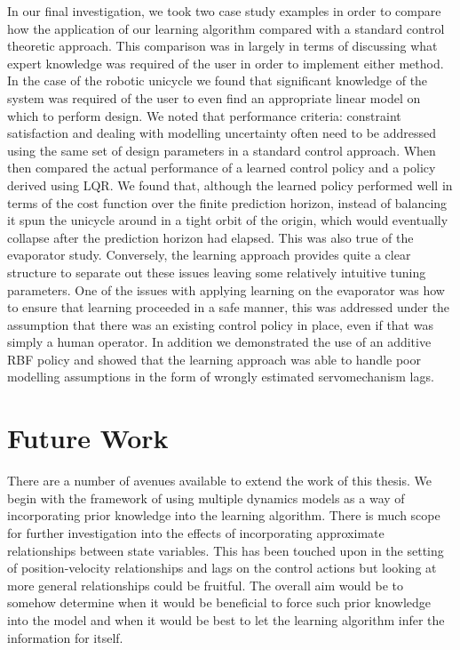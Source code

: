 In our final investigation, we took two case study examples in order to compare how the application of our learning algorithm compared with a standard control theoretic approach. This comparison was in largely in terms of discussing what expert knowledge was required of the user in order to implement either method.  In the case of the robotic unicycle we found that significant knowledge of the system was required of the user to even find an appropriate linear model on which to perform design. We noted that performance criteria: constraint satisfaction and dealing with modelling uncertainty often need to be addressed using the same set of design parameters in a standard control approach. When then compared the actual performance of a learned control policy and a policy derived using LQR. We found that, although the learned policy performed well in terms of the cost function over the finite prediction horizon, instead of balancing it spun the unicycle around in a tight orbit of the origin, which would eventually collapse after the prediction horizon had elapsed. This was also true of the evaporator study. Conversely, the learning approach provides quite a clear structure to separate out these issues leaving some relatively intuitive tuning parameters. One of the issues with applying learning on the evaporator was how to ensure that learning proceeded in a safe manner, this was addressed under the assumption that there was an existing control policy in place, even if that was simply a human operator. In addition we demonstrated the use of an additive RBF policy and showed that the learning approach was able to handle poor modelling assumptions in the form of wrongly estimated servomechanism lags.







\section{Future Work}
There are a number of avenues available to extend the work of this thesis. We begin with the framework of using multiple dynamics models as a way of incorporating prior knowledge into the learning algorithm. There is much scope for further investigation into the effects of incorporating approximate relationships between state variables. This has been touched upon in the setting of position-velocity relationships and lags on the control actions but looking at more general relationships could be fruitful. The overall aim would be to somehow determine when it would be beneficial to force such prior knowledge into the model and when it would be best to let the learning algorithm infer the information for itself.

